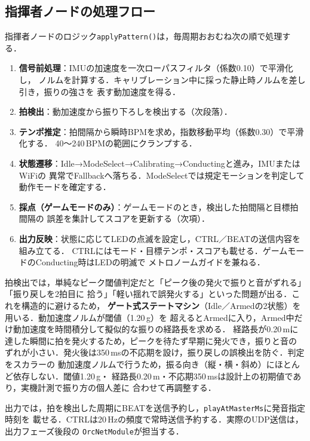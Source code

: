 \documentclass[lualatex,book,paper=a4paper,jafontsize=11.5pt,jafontscale=1.05]{jlreq}
\begin{document}
\subsection{指揮者ノードの処理フロー}
指揮者ノードのロジック\texttt{applyPattern()}は，毎周期おおむね次の順で処理する．
\begin{enumerate}[leftmargin=2.0em, itemsep=2pt]
  \item \textbf{信号前処理}：IMUの加速度を一次ローパスフィルタ（係数0.10）で平滑化し，
        ノルムを計算する．キャリブレーション中に採った静止時ノルムを差し引き，振りの強さを
        表す動加速度を得る．
  \item \textbf{拍検出}：動加速度から振り下ろしを検出する（次段落）．
  \item \textbf{テンポ推定}：拍間隔から瞬時BPMを求め，指数移動平均（係数0.30）で平滑化する．
        40〜240\,BPMの範囲にクランプする．
  \item \textbf{状態遷移}：Idle→ModeSelect→Calibrating→Conductingと進み，IMUまたはWiFiの
        異常でFallbackへ落ちる．ModeSelectでは規定モーションを判定して動作モードを確定する．
  \item \textbf{採点（ゲームモードのみ）}：ゲームモードのとき，検出した拍間隔と目標拍間隔の
        誤差を集計してスコアを更新する（次項）．
  \item \textbf{出力反映}：状態に応じてLEDの点滅を設定し，CTRL／BEATの送信内容を組み立てる．
        CTRLにはモード・目標テンポ・スコアも載せる．ゲームモードのConducting時はLEDの明滅で
        メトロノームガイドを兼ねる．
\end{enumerate}
拍検出では，単純なピーク閾値判定だと「ピーク後の発火で振りと音がずれる」「振り戻しを2拍目に
拾う」「軽い揺れで誤発火する」といった問題が出る．これを構造的に避けるため，
\textbf{ゲート式ステートマシン}（Idle／Armedの2状態）を用いる．動加速度ノルムが閾値（1.20\,g）を
超えるとArmedに入り，Armed中だけ動加速度を時間積分して擬似的な振りの経路長を求める．
経路長が0.20\,mに達した瞬間に拍を発火するため，ピークを待たず早期に発火でき，振りと音の
ずれが小さい．発火後は350\,msの不応期を設け，振り戻しの誤検出を防ぐ．判定をスカラーの
動加速度ノルムで行うため，振る向き（縦・横・斜め）にほとんど依存しない．閾値1.20\,g・
経路長0.20\,m・不応期350\,msは設計上の初期値であり，実機計測で振り方の個人差に
合わせて再調整する．

出力では，拍を検出した周期にBEATを送信予約し，\texttt{playAtMasterMs}に発音指定時刻を
載せる．CTRLは20\,Hzの頻度で常時送信予約する．実際のUDP送信は，出力フェーズ後段の
\texttt{OrcNetModule}が担当する．
\end{document}
